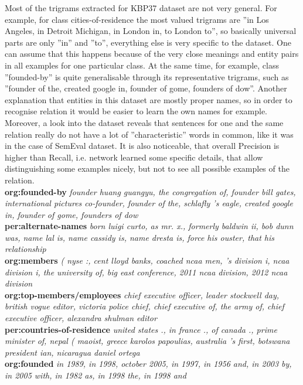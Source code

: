 Most of the trigrams extracted for KBP37 dataset are not very general. For example, for class 
cities-of-residence the most valued 
trigrams are ''in Los Angeles, in Detroit Michigan, in London in, to London to'', so basically 
universal parts are only ''in'' and ''to'', everything else is very specific to the dataset. One can 
assume that this happens because of the very close meanings and entity pairs in all examples 
for one particular class. At the same time, for example, class ''founded-by'' is quite generalisable 
through its representative trigrams, such as ''founder of the, created google in, founder of gome, founders of dow''. Another explanation that entities in this dataset are mostly proper names, so 
in order to recognise relation it would be easier to learn the own names for example. Moreover, a 
look into the dataset reveals that sentences for one and the same relation really do not have a lot of 
''characteristic'' words in common, like it was in the case of SemEval dataset. It is also noticeable, that overall Precision is higher than Recall, i.e. network learned some specific details, 
that allow distinguishing some examples nicely, but not to see all possible examples of the 
relation.
\\\textbf{org:founded-by} \textit{founder huang guangyu, the congregation of, founder bill gates, international pictures co-founder, founder of the, schlafly 's eagle, created google in, founder of gome, founders of dow}\\
\textbf{per:alternate-names} \textit{born luigi curto, as mr. x., formerly baldwin ii, bob dunn was, name lal is, name cassidy is, name dresta is, force his ouster, that his relationship}\\
\textbf{org:members} \textit{( nyse :, cent lloyd banks, coached ncaa men, 's division i, ncaa division i, the university of, big east conference, 2011 ncaa division, 2012 ncaa division}\\
\textbf{org:top-members/employees} \textit{chief executive officer, leader stockwell day, british vogue editor, victoria police chief, chief executive of, the army of, chief executive officer, alexandra shulman editor}\\
\textbf{per:countries-of-residence} \textit{united states ., in france ., of canada ., prime minister of, nepal ( maoist, greece karolos papoulias, australia 's first, botswana president ian, nicaragua daniel ortega}\\
\textbf{org:founded} \textit{in 1989, in 1998, october 2005, in 1997, in 1956 and, in 2003 by, in 2005 with, in 1982 as, in 1998 the, in 1998 and}\\
